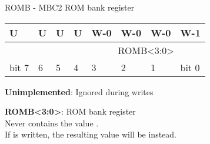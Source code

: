 \begin{register}[H]
  \caption{ROMB - MBC2 ROM bank register}
  {
    \ttfamily
    \begin{tabularx}{\textwidth}{|X|X|X|X|X|X|X|X|}
      \hline
      U                     & U                     & U                     & U                     & W-0                                    & W-0 & W-0 & W-1   \\
      \hline
      \cellcolor{LightGray} & \cellcolor{LightGray} & \cellcolor{LightGray} & \cellcolor{LightGray} & \multicolumn{4}{c|}{ROMB<3:0>} \\
      \hline
      bit 7                 & 6                     & 5                     & 4                     & 3                                      & 2   & 1   & bit 0 \\
      \hline
    \end{tabularx}
  }

  \begin{description}[leftmargin=5em, style=nextline]
    \item[bit 7-4]
      \textbf{Unimplemented}: Ignored during writes
    \item[bit 3-0]
      \textbf{ROMB<3:0>}: ROM bank register \\
      Never contains the value . \\
      If  is written, the resulting value will be  instead.
  \end{description}
\end{register}
